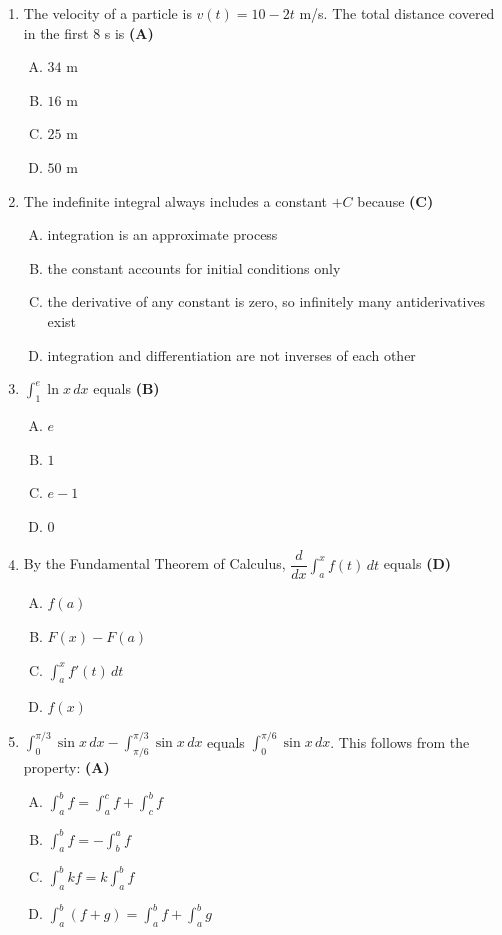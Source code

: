 \documentclass[10pt,a4paper]{article}
\begin{document}
\begin{enumerate}[1.]
\item The velocity of a particle is $v(t) = 10 - 2t$ m/s. The total distance covered in the first 8 s is \hfill \textbf{(A)}
\begin{enumerate}[(A)]
    \item $34$ m
    \item $16$ m
    \item $25$ m
    \item $50$ m
\end{enumerate}

\item The indefinite integral always includes a constant $+C$ because \hfill \textbf{(C)}
\begin{enumerate}[(A)]
    \item integration is an approximate process
    \item the constant accounts for initial conditions only
    \item the derivative of any constant is zero, so infinitely many antiderivatives exist
    \item integration and differentiation are not inverses of each other
\end{enumerate}

\item $\displaystyle\int_1^e \ln x\,dx$ equals \hfill \textbf{(B)}
\begin{enumerate}[(A)]
    \item $e$
    \item $1$
    \item $e-1$
    \item $0$
\end{enumerate}

\item By the Fundamental Theorem of Calculus, $\dfrac{d}{dx}\displaystyle\int_a^x f(t)\,dt$ equals \hfill \textbf{(D)}
\begin{enumerate}[(A)]
    \item $f(a)$
    \item $F(x) - F(a)$
    \item $\displaystyle\int_a^x f'(t)\,dt$
    \item $f(x)$
\end{enumerate}

\item $\displaystyle\int_0^{\pi/3} \sin x\,dx - \displaystyle\int_{\pi/6}^{\pi/3} \sin x\,dx$ equals $\displaystyle\int_0^{\pi/6} \sin x\,dx$. This follows from the property: \hfill \textbf{(A)}
\begin{enumerate}[(A)]
    \item $\displaystyle\int_a^b f = \displaystyle\int_a^c f + \displaystyle\int_c^b f$
    \item $\displaystyle\int_a^b f = -\displaystyle\int_b^a f$
    \item $\displaystyle\int_a^b kf = k\displaystyle\int_a^b f$
    \item $\displaystyle\int_a^b (f+g) = \displaystyle\int_a^b f + \displaystyle\int_a^b g$
\end{enumerate}


\end{enumerate}
\end{document}
